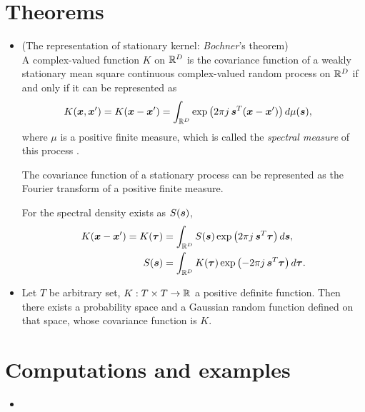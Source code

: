 \documentclass[11pt]{article}
\begin{document}
\section{Theorems}
\begin{itemize}
\item \begin{theorem} (The representation of stationary kernel: \emph{Bochner}'s theorem) \\
A complex-valued function $K$ on ${\mathbb R}^{D}$ is the covariance function of a weakly stationary mean square continuous complex-valued random process on ${\mathbb R}^D$ if and only if it can be represented as
\begin{align}
K(\boldsymbol{x}, \boldsymbol{x}') = K(\boldsymbol{x}-\boldsymbol{x}')&=\int_{{\mathbb R}^{D}} \exp\left( 2\pi j\,\boldsymbol{s}^{T}(\boldsymbol{x}-\boldsymbol{x}')\right)d\mu(\boldsymbol{s}), \label{eqn: Kernel_Fourier_1}
\end{align}
where $\mu$ is a positive finite measure, which is called the \emph{spectral measure} of this process \citep{lifshits2013gaussian}.
\end{theorem}
The covariance function of a stationary process can be represented as the Fourier transform of a positive finite measure.

For the spectral density exists as $S(\boldsymbol{s})$, 
\begin{align}
K(\boldsymbol{x}-\boldsymbol{x}')= K(\boldsymbol{\tau})&=\int_{{\mathbb R}^{D}} S(\boldsymbol{s})\exp\left(2\pi j\,\boldsymbol{s}^{T}\boldsymbol{\tau}\right)d\boldsymbol{s}, \nonumber\\
S(\boldsymbol{s}) &= \int_{{\mathbb R}^{D}} K(\boldsymbol{\tau})\exp\left(-2\pi j\,\boldsymbol{s}^{T}\boldsymbol{\tau}\right)d\boldsymbol{\tau}.\label{eqn: Kernel_Fourier_2}
\end{align}\vspace{10pt}

\item \begin{theorem}
Let $T$ be arbitrary set, $K: T\times T\rightarrow {\mathbb R}$ a positive definite function. Then there exists a probability space and a Gaussian random function defined on that space, whose covariance function is $K$.
\end{theorem}
\end{itemize}

\newpage
\section{Computations and examples}
\begin{itemize}
\item
\end{itemize}



\newpage


\end{document}
